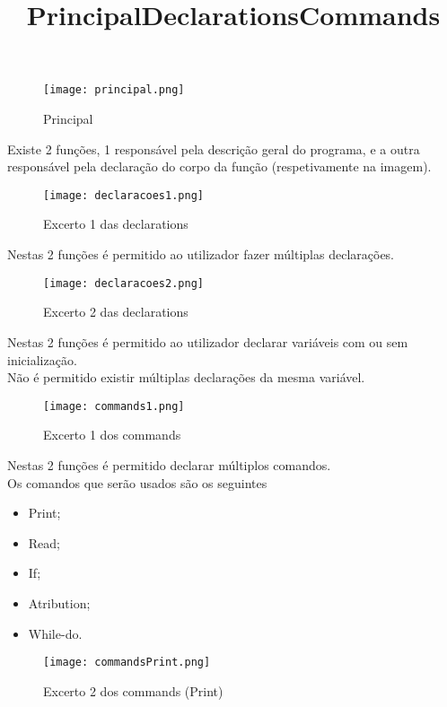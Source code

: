 \documentclass[11pt,a4paper]{report}%
\begin{document}
\title{\textbf{Principal}}


\begin{figure}[htbp]
\centerline{\texttt{[image: principal.png]}}
\caption{Principal}
\label{fig}
\end{figure} 

Existe 2 funções, 1 responsável pela descrição geral do programa, e a outra responsável pela declaração do corpo da função (respetivamente na imagem).

\newpage

\title{\textbf{Declarations}}


\begin{figure}[htbp]
\centerline{\texttt{[image: declaracoes1.png]}}
\caption{Excerto 1 das declarations}
\label{fig}
\end{figure} 
Nestas 2 funções é permitido ao utilizador fazer múltiplas declarações.\\

\begin{figure}[htbp]
\centerline{\texttt{[image: declaracoes2.png]}}
\caption{Excerto 2 das declarations}
\label{fig}
\end{figure} 

Nestas 2 funções é permitido ao utilizador declarar variáveis com ou sem inicialização.\\
Não é permitido existir múltiplas declarações da mesma variável.
\newpage

\title{\textbf{Commands}}
\begin{figure}[htbp]
\centerline{\texttt{[image: commands1.png]}}
\caption{Excerto 1 dos commands}
\label{fig}
\end{figure}

Nestas 2 funções é permitido declarar múltiplos comandos.\\
Os comandos que serão usados são os seguintes

\begin{itemize}
     \item Print;
     \item Read;
     \item If;
     \item Atribution;
     \item While-do.
  \end{itemize}

\newpage

\begin{figure}[htbp]
\centerline{\texttt{[image: commandsPrint.png]}}
\caption{Excerto 2 dos commands (Print)}
\label{fig}
\end{figure}
\end{document}
